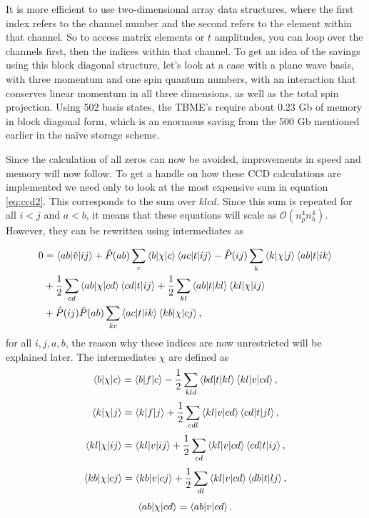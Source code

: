   It is more efficient to use two-dimensional array data
  structures, where the first index refers to the channel number and
  the second refers to the element within that channel. So to access
  matrix elements or $t$ amplitudes, you can loop over the channels
  first, then the indices within that channel. To get an idea of the
  savings using this block diagonal structure, let's look at a case
  with a plane wave basis, with three momentum and one spin quantum
  numbers, with an interaction that conserves linear momentum in all
  three dimensions, as well as the total spin projection. Using 502
  basis states, the TBME's require about 0.23 Gb of memory in block
  diagonal form, which is an enormous saving from the 500 Gb mentioned
  earlier in the na\"ive storage scheme.


  Since the calculation of all  zeros can now be avoided,
  improvements in speed and memory will now follow. To get a handle on
  how these CCD calculations are implemented we need only to look at the
  most expensive sum in equation \ref{eq:ccd2}. This corresponds to
  the sum over $klcd$. Since this sum is repeated for all $i < j$ and
  $a < b$, it means that these equations will scale as
  $\mathcal{O}(n_{p}^{4} n_{h}^{4})$. However,
  they can be rewritten using intermediates as

  \begin{align}
  0 &= \braket{ab|\hat{v}|ij} + \hat{P}(ab) \sum_{c} \braket{b| \chi
    |c} \braket{ac| t |ij} - \hat{P}(ij) \sum_{k} \braket{k| \chi |j}
  \braket{ab| t |ik} \nonumber \\ &+ \frac{1}{2}\sum_{cd} \braket{ab|
    \chi |cd} \braket{cd| t |ij} + \frac{1}{2} \sum_{kl} \braket{ab| t
    |kl} \braket{kl| \chi |ij} \\ &+ \hat{P}(ij)\hat{P}(ab) \sum_{kc}
  \braket{ac| t |ik}\braket{kb| \chi |cj}, \nonumber
  \end{align}
  for all $i,j,a,b$, the reason why these indices are now unrestricted
  will be explained later. The intermediates $\chi$ are defined as
  \begin{equation}
  \braket{b| \chi |c} = \braket{b|f|c} - \frac{1}{2} \sum_{kld}
  \braket{bd|t|kl} \braket{kl|v|cd},
  \end{equation}
  \begin{equation}
  \braket{k| \chi |j} = \braket{k|f|j} + \frac{1}{2} \sum_{cdl}
  \braket{kl|v|cd} \braket{cd|t|jl},
  \end{equation}
  \begin{equation}
  \braket{kl| \chi |ij} = \braket{kl|v|ij} + \frac{1}{2} \sum_{cd}
  \braket{kl|v|cd} \braket{cd|t|ij},
  \label{eq:mtxEx}
  \end{equation}
  \begin{equation}
  \braket{kb| \chi |cj} = \braket{kb|v|cj} + \frac{1}{2} \sum_{dl}
  \braket{kl|v|cd} \braket{db|t|lj},
  \end{equation}
  \begin{equation}
  \braket{ab| \chi |cd} = \braket{ab|v|cd}.
  \end{equation}



